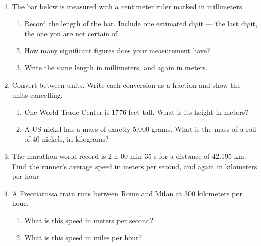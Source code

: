 \documentclass[12pt, twoside]{article}
\begin{document}
\begin{enumerate}[itemsep=0.5cm]
\newpage

\item The bar below is measured with a centimeter ruler marked in millimeters.

\begin{center}
\end{center}

  \begin{enumerate}[itemsep=0.9cm]
    \item Record the length of the bar. Include one estimated digit --- the last
      digit, the one you are not certain of.
    \item How many significant figures does your measurement have?
    \item Write the same length in millimeters, and again in meters.
  \end{enumerate} \vspace{1.0cm}

\item Convert between units. Write each conversion as a fraction and show the units
  cancelling.
  \begin{enumerate}[itemsep=2.6cm]
    \item One World Trade Center is 1776 feet tall. What is its height in meters?
    \item A US nickel has a mass of exactly 5.000 grams. What is the mass of a roll
      of 40 nickels, in kilograms?
  \end{enumerate} \vspace{2.4cm}

\item The marathon world record is 2 h 00 min 35 s for a distance of 42.195 km.
  Find the runner's average speed in meters per second, and again in kilometers per
  hour.

\newpage

\item A Frecciarossa train runs between Rome and Milan at 300 kilometers per hour.
  \begin{enumerate}[itemsep=2.6cm]
    \item What is this speed in meters per second?
    \item What is this speed in miles per hour?
  \end{enumerate} \vspace{2.4cm}


\end{enumerate}
\end{document}
